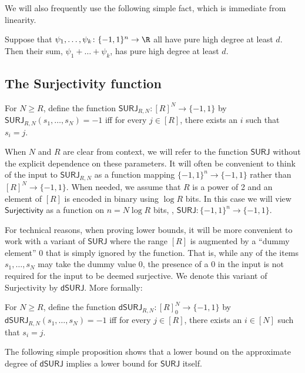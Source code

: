 \documentclass{toc}
\newcommand{\SURJ}{\mathsf{ SURJ}}
\newcommand{\Surjectivity}{\mathsf{Surjectivity}}
\newcommand{\dumSURJ}{\mathsf{dSURJ}}
\newcommand{\bits}{\{-1,1\}}
\begin{document}
We will also frequently use the following simple fact, which is immediate from linearity.

\begin{fact}
	\label{sumfact}
	Suppose that $\psi_1, \dots, \psi_k \colon \bits^n \to \R$ all have pure high degree at least $d$. Then their sum, $\psi_1 + \dots + \psi_k$,
	has pure high degree at least $d$.
\end{fact}



\subsection{The Surjectivity function}


\begin{definition}\label{def:surj}
	For $N \ge R$, define the function $\SURJ_{R, N} : [R]^N \to \bits$ by $\SURJ_{R, N}(s_1, \dots, s_N) = -1$ iff for every $j \in [R]$, there exists an $i$ such that $s_i = j$.
\end{definition}

When $N$ and $R$ are clear from context, we will refer to the function $\SURJ$ without the explicit dependence on these parameters. It will often be convenient to think of the input to $\SURJ_{R, N}$ as a function
mapping $\bits^n \to \bits$ rather than $[R]^N \to \bits$. 
When needed, we assume that $R$ is a power of 2 and an element of $[R]$ is encoded in binary using $\log R$ bits.
In this case we will view $\Surjectivity$ as a function on $n=N\log R$ bits, \ie,  $\SURJ: \bits^{n} \to \bits$.

For technical reasons, when proving lower bounds, it will be more convenient to work with a variant of $\SURJ$ where the range $[R]$ is augmented by a ``dummy element'' $0$ that is simply ignored by the function. That is, while any of the items $s_1, \dots, s_N$ may take the dummy value $0$, the presence of a $0$ in the input is not required for the input to be deemed surjective. We denote this variant of Surjectivity by $\dumSURJ$. More formally:

\begin{definition}\label{def:dumsurj}
	For $N \ge R$, define the function $\dumSURJ_{R, N} : [R]_0^N \to \bits$ by $\dumSURJ_{R, N}(s_1, \dots, s_N) = -1$ iff for every $j \in [R]$, there exists an $i \in [N]$ such that $s_i = j$.
\end{definition}

The following simple proposition shows that a lower bound on the approximate degree of $\dumSURJ$ implies a lower bound for $\SURJ$ itself.
\end{document}
